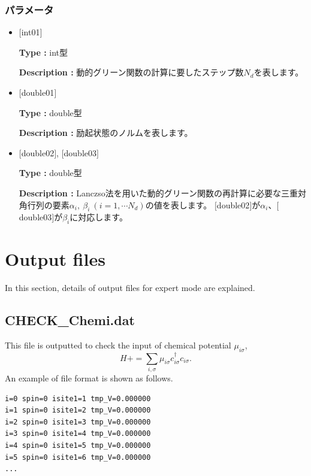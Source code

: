 \subsubsection{パラメータ}
 \begin{itemize}

  \item  $[$int01$]$

 {\bf Type :} int型

 {\bf Description :} 動的グリーン関数の計算に要したステップ数$N_d$を表します。

  \item  $[$double01$]$

 {\bf Type :} double型

{\bf Description :} 励起状態のノルムを表します。

 
 \item  $[$double02$]$, $[$double03$]$

 {\bf Type :} double型 

{\bf Description :} Lanczso法を用いた動的グリーン関数の再計算に必要な三重対角行列の要素$\alpha_i,~\beta_i~(i =1,\cdots N_d)$の値を表します。
$[$double02$]$が$\alpha_i$、$[$double03$]$が$\beta_i$に対応します。\\
\end{itemize}

\newpage
\section{Output files}
\label{Sec:outputfile}
In this section, details of output files for expert mode are explained.
\subsection{CHECK\_Chemi.dat}
\label{Subsec:checkchemi}
This file is outputted to check the input of chemical potential $\mu_{i\sigma}$,
\begin{equation}
H+=\sum_{i,\sigma} \mu_{i\sigma} c_{i\sigma}^{\dagger}c_{i\sigma}.
\end{equation}
An example of file format is shown as follows.

\begin{minipage}{12.5cm}
\begin{screen}
\begin{verbatim}
i=0 spin=0 isite1=1 tmp_V=0.000000 
i=1 spin=0 isite1=2 tmp_V=0.000000 
i=2 spin=0 isite1=3 tmp_V=0.000000 
i=3 spin=0 isite1=4 tmp_V=0.000000 
i=4 spin=0 isite1=5 tmp_V=0.000000 
i=5 spin=0 isite1=6 tmp_V=0.000000 
...
\end{verbatim}
\end{screen}
\end{minipage}

